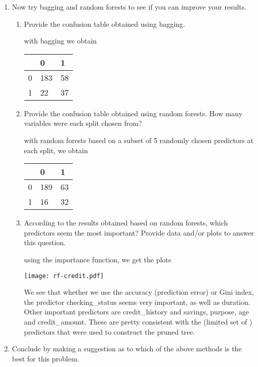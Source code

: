 \documentclass[11pt]{article}
\begin{document}
\begin{enumerate}
\begin{enumerate}
  \end{enumerate}
\item Now try bagging and random forests to see if you can improve your results.
  \begin{enumerate}
  \item Provide the confusion table obtained using bagging.
  
   with bagging we obtain
  
      \begin{tabular}{lll}
&   0 &  1\\
\hline
      0 &183 & 58\\
      1 & 22 & 37\\
\end{tabular}

  \item Provide the confusion table obtained using random forests. How many variables were each split chosen from? 
  
     with random forests based on a subset of 5 randomly chosen predictors at each split, we obtain
 
       \begin{tabular}{lll}
&   0 &  1\\
\hline
 0& 189 & 63\\
       1  &16  &32\\
\end{tabular}
      
      \item According to the results obtained based on random forests, which predictors seem the most important? Provide data and/or plots to answer this question.
      
       using the importance function, we get     the plots
      
     
      \texttt{[image: rf-credit.pdf]}
      
      We see that whether we use the accuracy (prediction error) or Gini index, the predictor checking\_status seems very important, as well as duration. Other important predictors are credit\_history and savings, purpose, age and  credit\_amount. These are pretty consistent with the (limited set of ) predictors that were used to construct the pruned tree.
            
  \end{enumerate}
  \item Conclude by making a suggestion as to which of the above methods is the best for this problem.
  

\end{enumerate}
\end{document}
